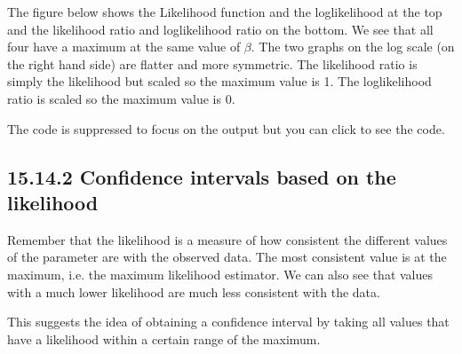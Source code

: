 \documentclass[letterpaper,10pt,english]{jupyterBook}
\begin{document}
\sphinxAtStartPar
The figure below shows the Likelihood function and the log\sphinxhyphen{}likelihood at the top and the likelihood ratio and log\sphinxhyphen{}likelihood ratio on the bottom. We see that all four have a maximum at the same value of \(\beta\). The two graphs on the log scale (on the right hand side) are flatter and more symmetric. The likelihood ratio is simply the likelihood but scaled so the maximum value is 1. The log\sphinxhyphen{}likelihood ratio is scaled so the maximum value is 0.

\sphinxAtStartPar
The code is suppressed to focus on the output but you can click to see the code.

\noindent{}


\subsection{15.14.2 Confidence intervals based on the likelihood}
\label{\detokenize{15.m. Logistic Regression:confidence-intervals-based-on-the-likelihood}}
\sphinxAtStartPar
Remember that the likelihood is a measure of how consistent the different values of the parameter are with the observed data. The most consistent value is at the maximum, i.e. the maximum likelihood estimator. We can also see that values with a much lower likelihood are much less consistent with the data.

\sphinxAtStartPar
This suggests the idea of obtaining a confidence interval by taking all values that have a likelihood within a certain range of the maximum.
\end{document}
